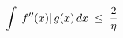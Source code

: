 \documentclass[preview]{standalone}
\begin{document}
\begin{align*}
\special{dvisvgm:raw <g id='unique000'>}\int |f''(x)|\,g(x)\,dx \;\le\; \frac{2}{\eta}\special{dvisvgm:raw </g>}
\end{align*}
\end{document}
